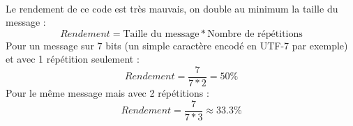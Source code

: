         \paragraph{}
Le rendement de ce code est très mauvais, on double au minimum la taille du message :
\[  Rendement = \text{Taille du message}*\text{Nombre de répétitions} \]
Pour un message sur 7 bits (un simple caractère encodé en UTF-7 par exemple) et avec 1 répétition seulement :
\[  Rendement = \frac{7}{7*2} = 50\% \]
Pour le même message mais avec 2 répétitions :
\[  Rendement = \frac{7}{7*3} \approx 33.3\% \]
